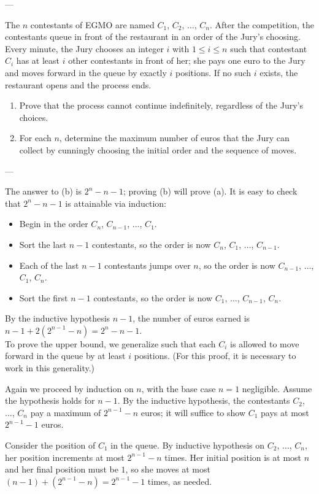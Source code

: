 
---

The $n$ contestants of EGMO are named $C_1$, $C_2$, $\ldots$, $C_n$. After the competition, the contestants queue in front of the restaurant in an order of the Jury's choosing. Every minute, the Jury chooses an integer $i$ with $1\le i\le n$ such that contestant $C_i$ has at least $i$ other contestants in front of her; she pays one euro to the Jury and moves forward in the queue by exactly $i$ positions. If no such $i$ exists, the restaurant opens and the process ends.
\begin{enumerate}[label=(\alph*)]
    \item Prove that the process cannot continue indefinitely, regardless of the Jury’s choices.
    \item For each $n$, determine the maximum number of euros that the Jury can collect by cunningly choosing the initial order and the sequence of moves.
\end{enumerate}

---

The answer to (b) is $2^n-n-1$; proving (b) will prove (a). It is easy to check that $2^n-n-1$ is attainable via induction:
\begin{itemize}[itemsep=0em]
    \item Begin in the order $C_n$, $C_{n-1}$, $\ldots$, $C_1$.
    \item Sort the last $n-1$ contestants, so the order is now $C_n$, $C_1$, $\ldots$, $C_{n-1}$.
    \item Each of the last $n-1$ contestants jumps over $n$, so the order is now $C_{n-1}$, $\ldots$, $C_1$, $C_n$.
    \item Sort the first $n-1$ contestants, so the order is now $C_1$, $\ldots$, $C_{n-1}$, $C_n$.
\end{itemize}
By the inductive hypothesis $n-1$, the number of euros earned is $n-1+2(2^{n-1}-n)=2^n-n-1$.\\

To prove the upper bound, we generalize such that each $C_i$ is allowed to move forward in the queue by at least $i$ positions. (For this proof, it is necessary to work in this generality.)

Again we proceed by induction on $n$, with the base case $n=1$ negligible. Assume the hypothesis holds for $n-1$. By the inductive hypothesis, the contestants $C_2$, $\ldots$, $C_n$ pay a maximum of $2^{n-1}-n$ euros; it will suffice to show $C_1$ pays at most $2^{n-1}-1$ euros.

Consider the position of $C_1$ in the queue. By inductive hypothesis on $C_2$, $\ldots$, $C_n$, her position increments at most $2^{n-1}-n$ times. Her initial position is at most $n$ and her final position must be $1$, so she moves at most $(n-1)+(2^{n-1}-n)=2^{n-1}-1$ times, as needed.



